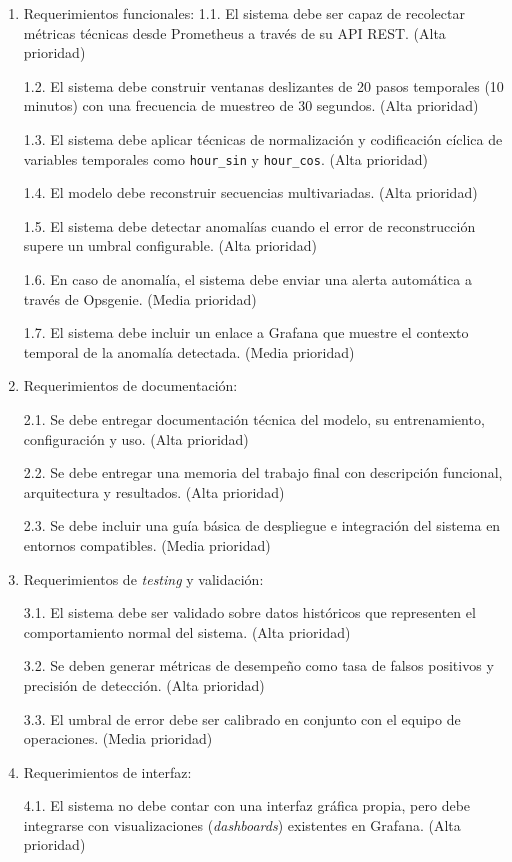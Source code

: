\documentclass[
11pt, %
]{charter}
\begin{document}
\begin{enumerate}
    \item Requerimientos\textbf{ }funcionales:
 1.1. El sistema debe ser capaz de recolectar métricas técnicas desde Prometheus a través de su API REST. (Alta prioridad)

 1.2. El sistema debe construir ventanas deslizantes de 20 pasos temporales (10 minutos) con una frecuencia de muestreo de 30 segundos. (Alta prioridad)

 1.3. El sistema debe aplicar técnicas de normalización y codificación cíclica de variables temporales como \verb|hour_sin| y \verb|hour_cos|. (Alta prioridad)

 1.4. El modelo debe reconstruir secuencias multivariadas. (Alta prioridad)

 1.5. El sistema debe detectar anomalías cuando el error de reconstrucción supere un umbral configurable. (Alta prioridad)

 1.6. En caso de anomalía, el sistema debe enviar una alerta automática a través de Opsgenie. (Media prioridad)

 1.7. El sistema debe incluir un enlace a Grafana que muestre el contexto temporal de la anomalía detectada. (Media prioridad)
    \item Requerimientos de documentación:

 2.1. Se debe entregar documentación técnica del modelo, su entrenamiento, configuración y uso. (Alta prioridad)

 2.2. Se debe entregar una memoria del trabajo final con descripción funcional, arquitectura y resultados. (Alta prioridad)

 2.3. Se debe incluir una guía básica de despliegue e integración del sistema en entornos compatibles. (Media prioridad)
    \item Requerimientos de \textit{testing} y validación:

 3.1. El sistema debe ser validado sobre datos históricos que representen el comportamiento normal del sistema. (Alta prioridad)

 3.2. Se deben generar métricas de desempeño como tasa de falsos positivos y precisión de detección. (Alta prioridad)

 3.3. El umbral de error debe ser calibrado en conjunto con el equipo de operaciones. (Media prioridad)
    \item Requerimientos de interfaz:

 4.1. El sistema no debe contar con una interfaz gráfica propia, pero debe integrarse con visualizaciones (\textit{dashboards}) existentes en Grafana. (Alta prioridad)


\end{enumerate}
\end{document}
